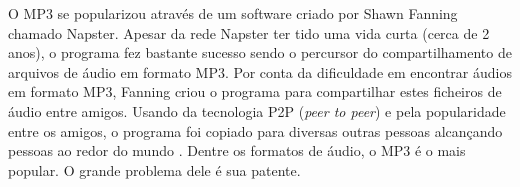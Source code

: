 O MP3 se popularizou através de um software criado por Shawn Fanning chamado Napster. Apesar da rede Napster ter tido uma vida curta (cerca de 2 anos), o programa fez bastante sucesso sendo o percursor do compartilhamento de arquivos de áudio em formato MP3. Por conta da dificuldade em encontrar áudios em formato MP3, Fanning criou o programa para compartilhar estes ficheiros de áudio entre amigos. Usando da tecnologia P2P (\textit{peer to peer}) e pela popularidade entre os amigos, o programa foi copiado para diversas outras pessoas alcançando pessoas ao redor do mundo \cite{mp3oquee}. Dentre os formatos de áudio, o MP3 é o mais popular. O grande problema dele é sua patente.







